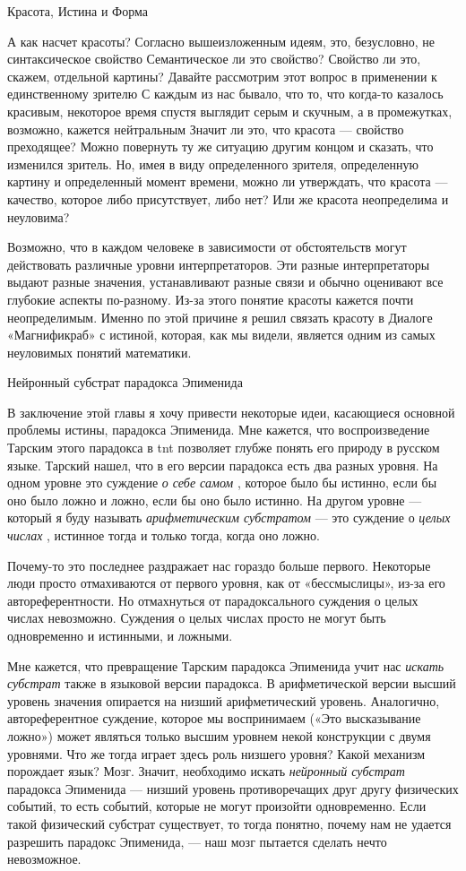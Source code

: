 \documentclass[../main.tex]{subfiles}
\begin{document}
Красота, Истина и Форма

А как насчет красоты? Согласно вышеизложенным идеям, это, безусловно, не синтаксическое свойство Семантическое ли это свойство? Свойство ли это, скажем, отдельной картины? Давайте рассмотрим этот вопрос в применении к единственному зрителю С каждым из нас бывало, что то, что когда-то казалось красивым, некоторое время спустя выглядит серым и скучным, а в промежутках, возможно, кажется нейтральным Значит ли это, что красота --- свойство преходящее? Можно повернуть ту же ситуацию другим концом и сказать, что изменился зритель. Но, имея в виду определенного зрителя, определенную картину и определенный момент времени, можно ли утверждать, что красота --- качество, которое либо присутствует, либо нет? Или же красота неопределима и неуловима?

Возможно, что в каждом человеке в зависимости от обстоятельств могут действовать различные уровни интерпретаторов. Эти разные интерпретаторы выдают разные значения, устанавливают разные связи и обычно оценивают все глубокие аспекты по-разному. Из-за этого понятие красоты кажется почти неопределимым. Именно по этой причине я решил связать красоту в Диалоге «Магнификраб» с истиной, которая, как мы видели, является одним из самых неуловимых понятий математики.

Нейронный субстрат парадокса Эпименида

В заключение этой главы я хочу привести некоторые идеи, касающиеся основной проблемы истины, парадокса Эпименида. Мне кажется, что воспроизведение Тарским этого парадокса в \acs{tnt} позволяет глубже понять его природу в русском языке. Тарский нашел, что в его версии парадокса есть два разных уровня. На одном уровне это суждение \emph{о себе самом} , которое было бы истинно, если бы оно было ложно и ложно, если бы оно было истинно. На другом уровне --- который я буду называть \emph{арифметическим субстратом} --- это суждение о \emph{целых числах} , истинное тогда и только тогда, когда оно ложно.

Почему-то это последнее раздражает нас гораздо больше первого. Некоторые люди просто отмахиваются от первого уровня, как от «бессмыслицы», из-за его автореферентности. Но отмахнуться от парадоксального суждения о целых числах невозможно. Суждения о целых числах просто не могут быть одновременно и истинными, и ложными.

Мне кажется, что превращение Тарским парадокса Эпименида учит нас \emph{искать субстрат} также в языковой версии парадокса. В арифметической версии высший уровень значения опирается на низший арифметический уровень. Аналогично, автореферентное суждение, которое мы воспринимаем («Это высказывание ложно») может являться только высшим уровнем некой конструкции с двумя уровнями. Что же тогда играет здесь роль низшего уровня? Какой механизм порождает язык? Мозг. Значит, необходимо искать \emph{нейронный субстрат} парадокса Эпименида --- низший уровень противоречащих друг другу физических событий, то есть событий, которые не могут произойти одновременно. Если такой физический субстрат существует, то тогда понятно, почему нам не удается разрешить парадокс Эпименида, --- наш мозг пытается сделать нечто невозможное.
\end{document}
